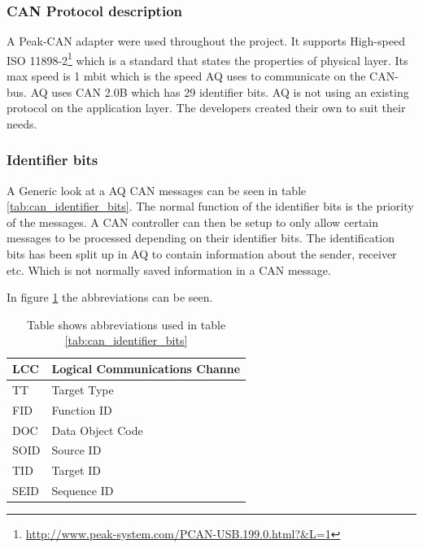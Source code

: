 \subsubsection{CAN Protocol description}
A Peak-CAN adapter were used throughout the project. It supports High-speed ISO 11898-2\footnote{\url{http://www.peak-system.com/PCAN-USB.199.0.html?&L=1}} which is a standard that states the properties of physical layer. 
Its max speed is 1 mbit which is the speed AQ uses to communicate on the CAN-bus. 
AQ uses CAN 2.0B which has 29 identifier bits.
AQ is not using an existing protocol on the application layer. The developers created their own to suit their needs.\\

\subsubsection*{Identifier bits}
A Generic look at a AQ CAN messages can be seen in table \ref{tab:can_identifier_bits}.
The normal function of the identifier bits is the priority of the messages.
A CAN controller can then be setup to only allow certain messages to be processed depending on their identifier bits.
The identification bits has been split up in AQ to contain information about the sender, receiver etc. Which is not normally saved information in a CAN message.
\begin{table}[H]
	\caption{Table shows the identifier bits used in AutoQuad CAN messages}
	\label{tab:can_identifier_bits}
\end{table}

In figure \ref{tab:abbri_can_msg} the abbreviations can be seen.
\begin{table}[H]
		\begin{tabular}{|l|l|}
		\hline
		LCC & Logical Communications Channe \\
\hline
		TT & Target Type \\
\hline
		FID & Function ID \\
\hline
		DOC & Data Object Code \\
\hline
		SOID & Source ID \\
\hline
		TID & Target ID \\
\hline
		SEID & Sequence ID \\
\hline
		\end{tabular}
		\caption{Table shows 
abbreviations used in table \ref{tab:can_identifier_bits}}
		\label{tab:abbri_can_msg}
\end{table}


